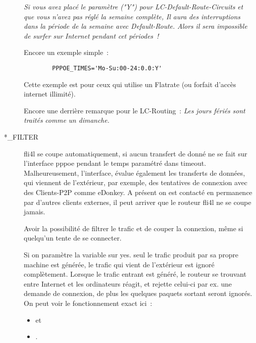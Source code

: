\begin{description}

        \emph{Si vous avez placé le paramètre ("Y") pour LC-Default-Route-Circuits
          et que vous n'avez pas réglé la semaine complète, Il aura des
          interruptions dans la période de la semaine avec Default-Route.
          Alors il sera impossible de surfer sur Internet pendant cet périodes~!}


Encore un exemple simple~:

\begin{example}
\begin{verbatim}
        PPPOE_TIMES='Mo-Su:00-24:0.0:Y'
\end{verbatim}
\end{example}

Cette exemple est pour ceux qui utilise un Flatrate (ou forfait d'accès
internet illimité).

Encore une derrière remarque pour le LC-Routing~: \emph{Les jours fériés
sont traités comme un dimanche.}

\item[*\_FILTER]

fli4l se coupe automatiquement, si aucun transfert de donné ne se fait sur
l'interface pppoe pendant le temps paramétré dans timeout. Malheureusement,
l'interface, évalue également les transferts de données, qui viennent de
l'extérieur, par exemple, des tentatives de connexion avec des Clients-P2P
comme eDonkey. A présent on est contacté en permanence par d'autres clients
externes, il peut arriver que le routeur fli4l ne se coupe jamais.

Avoir la possibilité de filtrer le trafic et de couper la connexion, même si 
quelqu'un tente de se connecter.

Si on paramètre la variable  sur yes. seul le trafic produit
par sa propre machine est générée, le trafic qui vient de l'extérieur est
ignoré complètement. Lorsque le trafic entrant est généré, le routeur se
trouvant entre Internet et les ordinateurs réagit, et rejette celui-ci
par ex. une demande de connexion, de plus les quelques paquets sortant seront
ignorés. On peut voir le fonctionnement exact ici~:
\begin{itemize}
\item {} et
\item {}.
\end{itemize}


\end{description}
